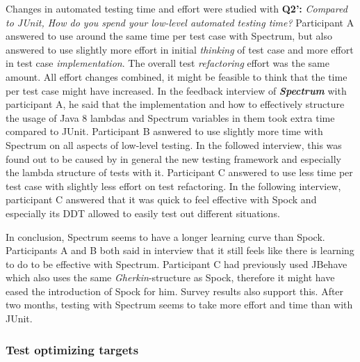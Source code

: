 Changes in automated testing time and effort were studied with \textbf{Q2':} \textit{Compared to JUnit, How do you spend your low-level automated testing time?}
Participant A answered
to use around the same time per test case with Spectrum, but also answered to use slightly more effort in initial \textit{thinking} of test
case and more effort in test case \textit{implementation}. The overall test \textit{refactoring} effort was the same amount. All effort changes combined, it might
be feasible to think that the time per test case might have increased. In the feedback interview of \textbf{\textit{Spectrum}} with participant
A, he said that the implementation and how to effectively structure the usage of Java 8 lambdas and Spectrum variables
in them took extra time compared to JUnit. Participant B asnwered to use slightly more time with Spectrum on all aspects of low-level testing.
In the followed interview, this was found out to be caused by in general the new testing framework and especially the lambda structure
of tests with it. Participant C answered to use less time per test case with slightly less effort on test refactoring. In the
following interview, participant C answered that it was quick to feel effective with Spock and especially its DDT allowed to
easily test out different situations.

In conclusion, Spectrum seems to have a longer learning curve than Spock. Participants A and B both said in interview that it still
feels like there is learning to do to be effective with Spectrum. Participant C had previously used JBehave which also
uses the same \textit{Gherkin}-structure as Spock, therefore it might have eased the introduction of Spock for him. Survey
results also support this. After two months, testing with Spectrum seems to take more effort and time than with JUnit.

\subsubsection{Test optimizing targets}

